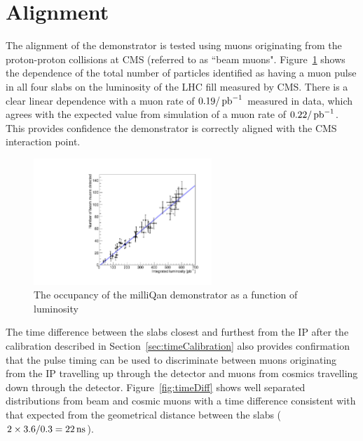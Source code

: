 \documentclass[12pt]{article}
\newcommand{\unit}[1]{\ensuremath{\text{\,#1}}\xspace}
\newcommand{\pbinv} {\mbox{\ensuremath{\,\text{pb}^{-1}}}\xspace}
\begin{document}
\section{Alignment}
\label{sec:alignment}

The alignment of the demonstrator is tested using muons originating from the proton-proton collisions 
at CMS (referred to as ``beam muons". Figure~\ref{fig:occ2d} shows the dependence of the total number of particles identified as having a muon pulse
in all four slabs on the luminosity of the LHC fill measured by CMS. There is a clear linear dependence with
a muon rate of $0.19/\pbinv$ measured in data, which agrees with the expected value from simulation
of a muon rate of $0.22/\pbinv$. This provides confidence the demonstrator is correctly aligned 
with the CMS interaction point.

\begin{figure}[ht!]
    \centering
    \includegraphics[width=0.6\textwidth]{figures/occ2d}
    \caption{\label{fig:occ2d} The occupancy of the milliQan demonstrator as a function of luminosity}
\end{figure}

The time difference between the slabs closest and furthest from the IP after the 
calibration described in Section~\ref{sec:timeCalibration} also provides confirmation
that the pulse timing can be used to discriminate between muons originating from the IP
travelling up through the detector and muons from cosmics travelling down through the detector. 
Figure~\ref{fig:timeDiff} shows well separated distributions from beam and cosmic muons with a time difference
consistent with that expected from the geometrical distance between the slabs ($2\times3.6/0.3 = 22\unit{ns}$).
\end{document}

